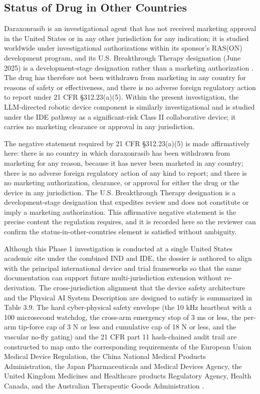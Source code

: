 \subsection{Status of Drug in Other Countries}

Daraxonrasib is an investigational agent that has not received marketing approval
in the United States or in any other jurisdiction for any indication; it is studied
worldwide under investigational authorizations within its sponsor's RAS(ON)
development program, and its U.S. Breakthrough Therapy designation (June 2025) is a
development-stage designation rather than a marketing authorization
\cite{daraxwhipple, onpremwhippl}. The drug has therefore not been withdrawn from
marketing in any country for reasons of safety or effectiveness, and there is no
adverse foreign regulatory action to report under 21 CFR \S 312.23(a)(5). Within the
present investigation, the LLM-directed robotic device component is similarly
investigational and is studied under the IDE pathway as a significant-risk Class II
collaborative device; it carries no marketing clearance or approval in any
jurisdiction.

The negative statement required by 21 CFR \S 312.23(a)(5) is made affirmatively
here: there is no country in which daraxonrasib has been withdrawn from marketing for
any reason, because it has never been marketed in any country; there is no adverse
foreign regulatory action of any kind to report; and there is no marketing
authorization, clearance, or approval for either the drug or the device in any
jurisdiction. The U.S. Breakthrough Therapy designation is a development-stage
designation that expedites review and does not constitute or imply a marketing
authorization. This affirmative negative statement is the precise content the
regulation requires, and it is recorded here so the reviewer can confirm the
status-in-other-countries element is satisfied without ambiguity.

Although this Phase 1 investigation is conducted at a single United States academic
site under the combined IND and IDE, the dossier is authored to align with the
principal international device and trial frameworks so that the same documentation
can support future multi-jurisdiction extension without re-derivation. The
cross-jurisdiction alignment that the device safety architecture and the
Physical AI System Description are designed to satisfy is summarized in Table 3.9. The
hard cyber-physical safety envelope (the 10 kHz heartbeat with a 100 microsecond
watchdog, the cross-arm emergency stop of 3 ms or less, the per-arm tip-force cap of
3 N or less and cumulative cap of 18 N or less, and the vascular no-fly gating) and
the 21 CFR part 11 hash-chained audit trail are constructed to map onto the
corresponding requirements of the European Union Medical Device Regulation, the
China National Medical Products Administration, the Japan Pharmaceuticals and
Medical Devices Agency, the United Kingdom Medicines and Healthcare products
Regulatory Agency, Health Canada, and the Australian Therapeutic Goods
Administration \cite{natlpaiplatf, cfr312paiuni}.

